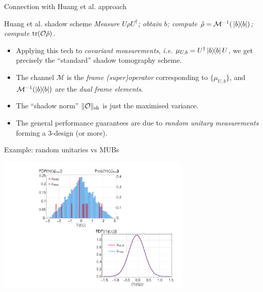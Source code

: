 \documentclass{beamer}
\begin{document}
\begin{frame}{Connection with Huang et al. approach}
    \begin{center}
    \begin{beamerboxesrounded}[shadow=true]{Huang et al. shadow scheme}
    \textit{
    Measure $U\rho U^\dagger$; 
    obtain $b$; 
    compute $\hat\rho=\mathcal M^{-1}(\ketbra*{b})$; 
    compute $\trace(\mathcal O\hat\rho)$.
    }
    \end{beamerboxesrounded}
    \end{center}
    \begin{itemize}\setlength\itemsep{0.5em}
        \item \colorbox{orange!15}{\parbox[t]{\dimexpr\linewidth-2\fboxsep}{
            Applying this tech to \textit{covariant measurements}, \textit{i.e.}
            $\mu_{U,b} = U^\dagger \ketbra{b} U$, we 
            get precisely the ``standard'' shadow tomography scheme.
        }} \pause
        \item The channel $\mathcal M$ is the \textit{frame (super)operator} corresponding to $\{\mu_{U,b}\}$, and $\mathcal M^{-1}(\ketbra{b})$ are the \textit{dual frame elements}. \pause
        \item The ``shadow norm'' $\|\mathcal O\|_{\rm sh}$ is just the maximised variance. \pause
        \item The general performance guarantees are due to \textit{random unitary measurements} forming a 3-design (or more).
    \end{itemize}
\end{frame}

\begin{frame}{Example: random unitaries vs MUBs}
    \begin{center}
    \includegraphics[width=0.7\textwidth]{figures/hist_MUB_Preskill.pdf}
    \end{center}
\end{frame}
\end{document}
